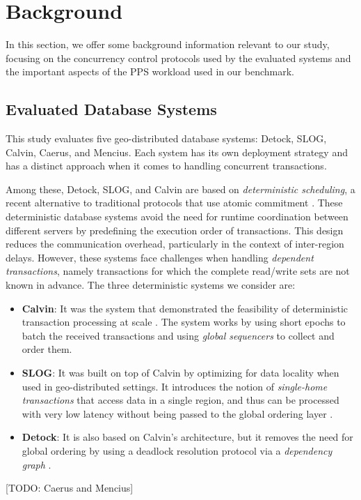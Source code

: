 \section{Background}
\label{sec: background}

In this section, we offer some background information relevant to our study, focusing on the concurrency control protocols used by the evaluated systems and the important aspects of the PPS workload used in our benchmark.

\subsection{Evaluated Database Systems}
This study evaluates five geo-distributed database systems: Detock, SLOG, Calvin, Caerus, and Mencius. Each system has its own deployment strategy and has a distinct approach when it comes to handling concurrent transactions.

Among these, Detock, SLOG, and Calvin are based on \textit{deterministic scheduling}, a recent alternative to traditional protocols that use atomic commitment \cite{thomson2010case}. These deterministic database systems avoid the need for runtime coordination between different servers by predefining the execution order of transactions. This design reduces the communication overhead, particularly in the context of inter-region delays. However, these systems face challenges when handling \textit{dependent transactions}, namely transactions for which the complete read/write sets are not known in advance. The three deterministic systems we consider are:
\begin{itemize}
    \item \textbf{Calvin}: It was the system that demonstrated the feasibility of deterministic transaction processing at scale \cite{thomson2012calvin}. The system works by using short epochs to batch the received transactions and using \textit{global sequencers} to collect and order them.
    \item \textbf{SLOG}: It was built on top of Calvin by optimizing for data locality when used in geo-distributed settings. It introduces the notion of \textit{single-home transactions} that access data in a single region, and thus can be processed with very low latency without being passed to the global ordering layer \cite{ren2019slog}.
    \item \textbf{Detock}: It is also based on Calvin's architecture, but it removes the need for global ordering by using a deadlock resolution protocol via a \textit{dependency graph} \cite{nguyen2023detock}.
\end{itemize}
[TODO: Caerus and Mencius]

